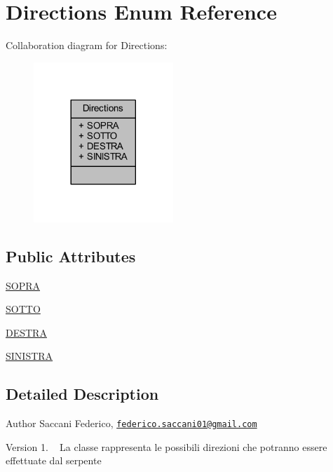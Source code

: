 \hypertarget{enum_snake_1_1game_1_1utility_1_1_directions}{}\section{Directions Enum Reference}
\label{enum_snake_1_1game_1_1utility_1_1_directions}


Collaboration diagram for Directions\+:
\nopagebreak
\begin{figure}[H]
\begin{center}
\leavevmode
\includegraphics[width=149pt]{enum_snake_1_1game_1_1utility_1_1_directions__coll__graph}
\end{center}
\end{figure}
\subsection*{Public Attributes}
\begin{DoxyCompactItemize}
\item 
\mbox{\hyperlink{enum_snake_1_1game_1_1utility_1_1_directions_a6618b322e7de5b853ac903da736e5dbc}{S\+O\+P\+RA}}
\item 
\mbox{\hyperlink{enum_snake_1_1game_1_1utility_1_1_directions_a6fcef6b13f7f1deeda7fee7cf15280be}{S\+O\+T\+TO}}
\item 
\mbox{\hyperlink{enum_snake_1_1game_1_1utility_1_1_directions_ac15481c77c0c558ceeb3abf2e3b799ab}{D\+E\+S\+T\+RA}}
\item 
\mbox{\hyperlink{enum_snake_1_1game_1_1utility_1_1_directions_aefdfbf72cfaabb51a33d6d9e10add0b5}{S\+I\+N\+I\+S\+T\+RA}}
\end{DoxyCompactItemize}


\subsection{Detailed Description}
\begin{DoxyAuthor}{Author}
Saccani Federico, \href{mailto:federico.saccani01@gmail.com}{\tt federico.\+saccani01@gmail.\+com} 
\end{DoxyAuthor}
\begin{DoxyVersion}{Version}
1. ~\newline
La classe rappresenta le possibili direzioni che potranno essere effettuate dal serpente 
\end{DoxyVersion}


